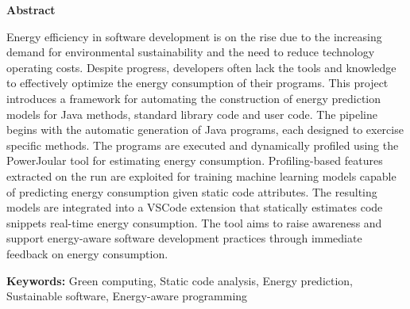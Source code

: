 \vspace*{2cm}
\begin{center}
\Large \bf Abstract
\end{center}
\vspace*{1cm} \setlength{\baselineskip}{0.6cm}

  Energy efficiency in software development is on the rise due to the increasing demand for environmental sustainability and the need to reduce technology operating costs. Despite progress, developers often lack the tools and knowledge to effectively optimize the energy consumption of their programs. 
  This project introduces a framework for automating the construction of energy prediction models for Java methods, standard library code and user code. The pipeline begins with the automatic generation of Java programs, each designed to exercise specific methods. The programs are executed and dynamically profiled using the PowerJoular tool for estimating energy consumption. Profiling-based features extracted on the run are exploited for training machine learning models capable of predicting energy consumption given static code attributes. The resulting models are integrated into a VSCode extension that statically estimates code snippets real-time energy consumption. The tool aims to raise awareness and support energy-aware software development practices through immediate feedback on energy consumption.


\vfill

\begin{flushleft}
\textbf{Keywords:}
Green computing, Static code analysis, Energy prediction, Sustainable software, Energy-aware programming
\end{flushleft}

{}
